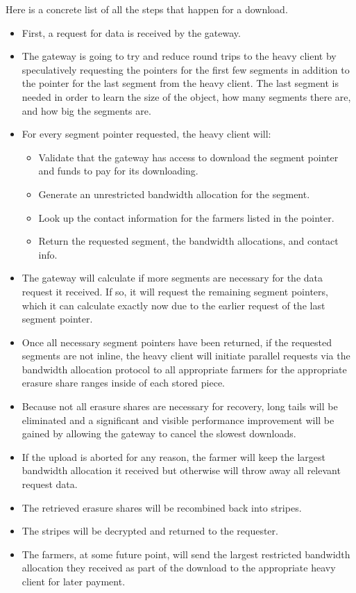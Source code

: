\documentclass[a4paper,10pt]{article} \usepackage[utf8]{inputenc}
\begin{document}
Here is a concrete list of all the steps that happen for a download.

\begin{itemize}
\item First, a request for data is received by the gateway.
\item The gateway is going to try and reduce round trips to the heavy client
  by speculatively requesting the pointers for the first few segments in
  addition to the pointer for the last segment from the heavy client. The last
  segment is needed in order to learn the size of the object, how many segments
  there are, and how big the segments are.
\item For every segment pointer requested, the heavy client will:
  \begin{itemize}
  \item Validate that the gateway has access to download the segment pointer
    and funds to pay for its downloading.
  \item Generate an unrestricted bandwidth allocation for the segment.
  \item Look up the contact information for the farmers listed in the pointer.
  \item Return the requested segment, the bandwidth allocations, and contact
    info.
  \end{itemize}
\item The gateway will calculate if more segments are necessary for the
  data request it received. If so, it will request the remaining segment
  pointers, which it can calculate exactly now due to the earlier request of
  the last segment pointer.
\item Once all necessary segment pointers have been returned, if the requested
  segments are not inline, the heavy client will initiate parallel requests
  via the bandwidth allocation protocol to all appropriate farmers for the
  appropriate erasure share ranges inside of each stored piece.
\item Because not all erasure shares are necessary for recovery, long tails
  will be eliminated and a significant and visible performance improvement will
  be gained by allowing the gateway to cancel the slowest downloads.
\item If the upload is aborted for any reason, the farmer will keep the
  largest bandwidth allocation it received but otherwise will throw away all
  relevant request data.
\item The retrieved erasure shares will be recombined back into stripes.
\item The stripes will be decrypted and returned to the requester.
\item The farmers, at some future point, will send the largest restricted
  bandwidth allocation they received as part of the download to the appropriate
  heavy client for later payment.
\end{itemize}
\end{document}
